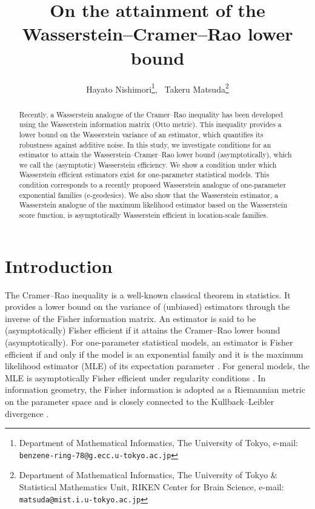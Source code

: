 \documentclass[11pt, a4paper]{article}
\begin{document}
	\title{On the attainment of the Wasserstein--Cramer--Rao lower bound}

\author{Hayato Nishimori\thanks{Department of Mathematical Informatics, The University of Tokyo, e-mail: \texttt{benzene-ring-78@g.ecc.u-tokyo.ac.jp}}, \ 
	Takeru Matsuda\thanks{Department of Mathematical Informatics, The University of Tokyo \& Statistical Mathematics Unit, RIKEN Center for Brain Science, e-mail: \texttt{matsuda@mist.i.u-tokyo.ac.jp}}}

\date{}

\maketitle
	
	
	\begin{abstract}
		Recently, a Wasserstein analogue of the Cramer--Rao inequality has been developed using the Wasserstein information matrix (Otto metric).
		This inequality provides a lower bound on the Wasserstein variance of an estimator, which quantifies its robustness against additive noise.
		In this study, we investigate conditions for an estimator to attain the Wasserstein--Cramer--Rao lower bound (asymptotically), which we call the (asymptotic) Wasserstein efficiency. 
		We show a condition under which Wasserstein efficient estimators exist for one-parameter statistical models.
		This condition corresponds to a recently proposed Wasserstein analogue of one-parameter exponential families (e-geodesics). 
		We also show that the Wasserstein estimator, a Wasserstein analogue of the maximum likelihood estimator based on the Wasserstein score function, is asymptotically Wasserstein efficient in location-scale families.
	\end{abstract}
	
	\section{Introduction}\label{introduction}
The Cramer--Rao inequality is a well-known classical theorem in statistics. 
It provides a lower bound on the variance of (unbiased) estimators through the inverse of the Fisher information matrix.
An estimator is said to be (asymptotically) Fisher efficient if it attains the Cramer--Rao lower bound (asymptotically).
For one-parameter statistical models, an estimator is Fisher efficient if and only if the model is an exponential family and it is the maximum likelihood estimator (MLE) of its expectation parameter \citep{Fisher_efficiency2, Fisher_efficiency}. For general models, the MLE is asymptotically Fisher efficient under regularity conditions \citep{vV}. In information geometry, the Fisher information is adopted as a Riemannian metric on the parameter space and is closely connected to the Kullback--Leibler divergence \citep{amari2000methods}. 
\end{document}
